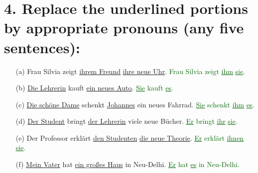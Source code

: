 \documentclass{article}
\begin{document}
\section*{4. Replace the underlined portions by appropriate pronouns (any five sentences):}
\begin{enumerate}
    \item[(a)] Frau Silvia zeigt \underline{ihrem Freund} \underline{ihre neue Uhr}. \textcolor{darkgreen}{Frau Silvia zeigt \underline{ihm} \underline{sie}.}
    \item[(b)] \underline{Die Lehrerin} kauft \underline{ein neues Auto}. \textcolor{darkgreen}{\underline{Sie} kauft \underline{es}.}
    \item[(c)] \underline{Die schöne Dame} schenkt \underline{Johannes} ein neues Fahrrad. \textcolor{darkgreen}{\underline{Sie} schenkt \underline{ihm} \underline{es}.}
    \item[(d)] \underline{Der Student} bringt \underline{der Lehrerin} viele neue Bücher. \textcolor{darkgreen}{\underline{Er} bringt \underline{ihr} \underline{sie}.}
    \item[(e)] Der Professor erklärt \underline{den Studenten} \underline{die neue Theorie}. \textcolor{darkgreen}{\underline{Er} erklärt \underline{ihnen} \underline{sie}.}
    \item[(f)] \underline{Mein Vater} hat \underline{ein großes Haus} in Neu-Delhi. \textcolor{darkgreen}{\underline{Er} hat \underline{es} in Neu-Delhi.}
\end{enumerate}
\end{document}
